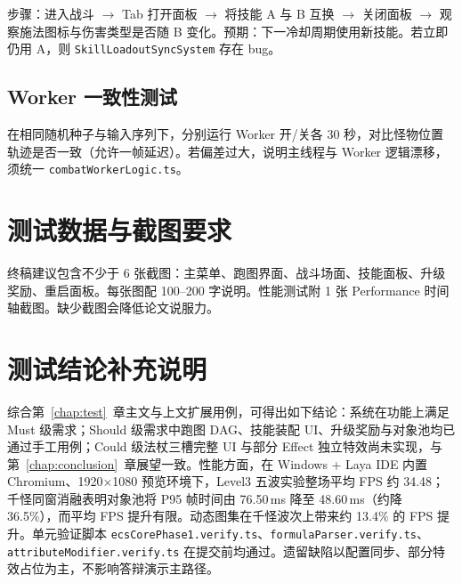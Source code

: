 步骤：进入战斗 $\rightarrow$ Tab 打开面板 $\rightarrow$ 将技能 A 与 B 互换 $\rightarrow$ 关闭面板 $\rightarrow$ 观察施法图标与伤害类型是否随 B 变化。预期：下一冷却周期使用新技能。若立即仍用 A，则 \texttt{SkillLoadoutSyncSystem} 存在 bug。

\subsection{Worker 一致性测试}

在相同随机种子与输入序列下，分别运行 Worker 开/关各 30 秒，对比怪物位置轨迹是否一致（允许一帧延迟）。若偏差过大，说明主线程与 Worker 逻辑漂移，须统一 \texttt{combatWorkerLogic.ts}\cite{mckenzie2008crowd}。

\section{测试数据与截图要求}

终稿建议包含不少于 6 张截图：主菜单、跑图界面、战斗场面、技能面板、升级奖励、重启面板。每张图配 100--200 字说明。性能测试附 1 张 Performance 时间轴截图。缺少截图会降低论文说服力。

\section{测试结论补充说明}

综合第~\ref{chap:test}~章主文与上文扩展用例，可得出如下结论：系统在功能上满足 Must 级需求；Should 级需求中跑图 DAG、技能装配 UI、升级奖励与对象池均已通过手工用例；Could 级法杖三槽完整 UI 与部分 Effect 独立特效尚未实现，与第~\ref{chap:conclusion}~章展望一致。性能方面，在 Windows + Laya IDE 内置 Chromium、1920$\times$1080 预览环境下，Level3 五波实验整场平均 FPS 约 34.48；千怪同窗消融表明对象池将 P95 帧时间由 76.50\,ms 降至 48.60\,ms（约降 36.5\%），而平均 FPS 提升有限。动态图集在千怪波次上带来约 13.4\% 的 FPS 提升。单元验证脚本 \texttt{ecsCorePhase1.verify.ts}、\texttt{formulaParser.verify.ts}、\texttt{attributeModifier.verify.ts} 在提交前均通过。遗留缺陷以配置同步、部分特效占位为主，不影响答辩演示主路径。

